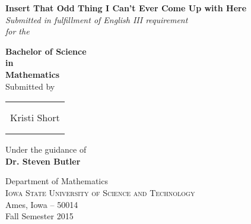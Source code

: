 \begin{titlepage}

\begin{center}

\Huge \textbf {Insert That Odd Thing I Can't Ever Come Up with Here}\\[0.5in]

       \small \emph{Submitted in fulfillment of English III requirement}\\
		\newline
        \small \emph{for the}
		\vspace{.2in}

       {\bf Bachelor of Science \\in\\ Mathematics}\\[0.5in]

\normalsize Submitted by \\
\begin{table}[h]
\centering
\begin{tabular}{c}\hline \\
\\
Kristi Short \\ \\ \\ \hline 
\end{tabular}
\end{table}

\vspace{.1in}
Under the guidance of\\
{\textbf{Dr. Steven Butler}}\\[0.2in]

\vfill

\Large{Department of Mathematics}\\
\normalsize
\textsc{Iowa State University of Science and Technology}\\
Ames, Iowa -- 50014 \\
\vspace{0.2cm}
Fall Semester 2015

\end{center}

\end{titlepage}

